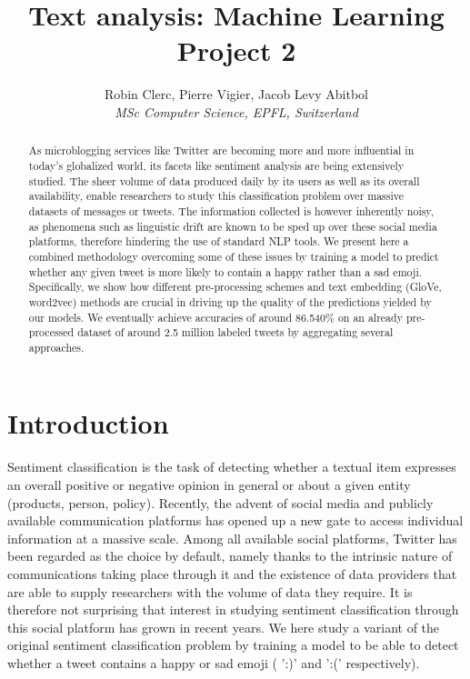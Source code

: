\documentclass[10pt,conference,compsocconf]{IEEEtran}
\begin{document}
\title{Text analysis: Machine Learning Project 2}

\author{
  Robin Clerc, Pierre Vigier, Jacob Levy Abitbol\\
  \textit{MSc  Computer Science, EPFL, Switzerland}
}

\maketitle

\begin{abstract}
As microblogging services like Twitter are becoming
more and more influential in today’s globalized world, its facets
like sentiment analysis are being extensively studied. The sheer volume of data produced daily by its users as well as its overall availability, enable researchers to study this classification problem over massive datasets of messages or tweets. The information collected is however inherently noisy, as phenomena such as linguistic drift are known to be sped up over these social media platforms, therefore hindering the use of standard NLP tools. We present here a combined methodology overcoming some of these issues by training a model to predict whether any given tweet is more likely to contain a happy rather than a sad emoji. Specifically, we show how different pre-processing schemes and text embedding (GloVe, word2vec) methods are crucial in driving up the quality of the  predictions yielded by our models. We eventually achieve accuracies of around 86.540\% on an already pre-processed dataset of around 2.5 million labeled tweets by aggregating several approaches.
\end{abstract}








\section{Introduction}
Sentiment classification is the task of detecting whether a textual item expresses an overall positive or negative opinion in general or about a given entity (products, person, policy).
Recently, the advent of social media and publicly available communication platforms has opened up a new gate to access individual information at a massive scale. Among all available social platforms, Twitter has been regarded as the choice by default, namely thanks to the intrinsic nature of communications taking place through it and the existence of data providers that are able to supply researchers with the volume of data they require. It is therefore not surprising that interest in studying sentiment classification through this social platform has grown in recent years. We here study a variant of the original sentiment classification problem by training a model to be able to detect whether a tweet contains  a  happy or sad emoji ( ':)' and  ':('   respectively).
\end{document}
